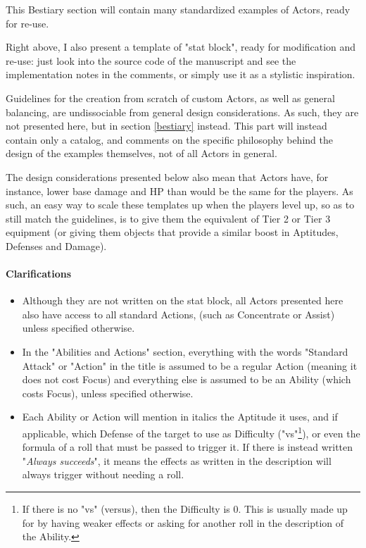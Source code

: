 This Bestiary section will contain many standardized examples of Actors, ready for re-use.

Right above, I also present a template of "stat block", ready for modification and re-use: just look into the source code of the manuscript and see the implementation notes in the comments, or simply use it as a stylistic inspiration.

\begin{rpg-examplebox}
    Guidelines for the creation from scratch of custom Actors, as well as general balancing, are undissociable from general design considerations. As such, they are not presented here, but in section \ref{bestiary} instead. This part will instead contain only a catalog, and comments on the specific philosophy behind the design of the examples themselves, not of all Actors in general.
\end{rpg-examplebox}

The design considerations presented below also mean that Actors have, for instance, lower base damage and HP than would be the same for the players. As such, an easy way to scale these templates up when the players level up, so as to still match the guidelines, is to give them the equivalent of Tier 2 or Tier 3 equipment (or giving them objects that provide a similar boost in Aptitudes, Defenses and Damage).

\paragraph{Clarifications}

\begin{itemize}
    \item Although they are not written on the stat block, all Actors presented here also have access to all standard Actions, (such as Concentrate or Assist) unless specified otherwise.
    \item In the "Abilities and Actions" section, everything with the words "Standard Attack" or "Action" in the title is assumed to be a regular Action (meaning it does not cost Focus) and everything else is assumed to be an Ability (which costs Focus), unless specified otherwise.
    \item Each Ability or Action will mention in italics the Aptitude it uses, and if applicable, which Defense of the target to use as Difficulty ("vs"\footnote{If there is no "vs" (versus), then the Difficulty is 0. This is usually made up for by having weaker effects or asking for another roll in the description of the Ability.}), or even the formula of a roll that must be passed to trigger it. If there is instead written "\textit{Always succeeds}", it means the effects as written in the description will always trigger without needing a roll.
\end{itemize}



